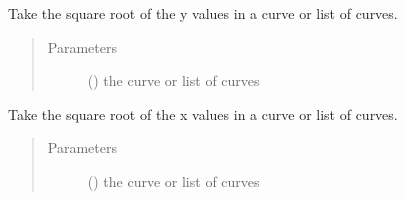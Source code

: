 \documentclass[letterpaper,10pt,english]{sphinxmanual}
\begin{document}

\begin{fulllineitems}
\label{\detokenize{pydv:pydvpy.sqrt}}
Take the square root of the y values in a curve or list of curves.
\begin{quote}\begin{description}
\item[{Parameters}] \leavevmode
{} () \textendash{} the curve or list of curves

\end{description}\end{quote}

\end{fulllineitems}


\begin{fulllineitems}
\label{\detokenize{pydv:pydvpy.sqrtx}}
Take the square root of the x values in a curve or list of curves.
\begin{quote}\begin{description}
\item[{Parameters}] \leavevmode
{} () \textendash{} the curve or list of curves

\end{description}\end{quote}

\end{fulllineitems}

\end{document}
